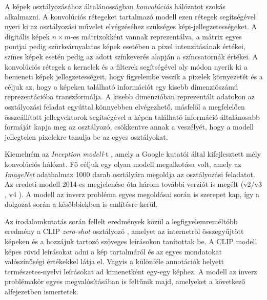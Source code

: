 A képek osztályozásához általánosságban \textit{konvolúciós} hálózatot szokás alkalmazni. A konvolúciós rétegeket tartalmazó modell ezen rétegek segítségével nyeri ki az osztályozási művelet elvégzéséhez szükséges képi-jellegzetességeket. A digitális képek $n \times m$-es mátrixokként vannak reprezentálva, a mátrix egyes pontjai pedig szürkeárnyalatos képek esetében a pixel intenzitásának értékei, színes képek esetén pedig az adott színkeverés alapján a színcsatornák értékei. A konvolúciós rétegek a kernelek és a filterek segítségével oly módon nyerik ki a bemeneti képek jellegzetességeit, hogy figyelembe veszik a pixelek környezetét és a céljuk az, hogy a képeken található információt egy kisebb dimenziószámú reprezentációba transzformálja. A kisebb dimenzióban reprezentált adatokon az osztályozási feladat egyúttal könnyebben elvégezhető, másfelől a megfelelően összeállított jellegvektorok segítségével a képen található információ általánosabb formáját kapja meg az osztályozó, csökkentve annak a veszélyét, hogy a modell jellegtelen pixelekre tanulja be az egyes osztályokat.

Kiemelném az \textit{Inception modell}-t \cite{szegedy2015going}, amely a Google kutatói által kifejlesztett mély konvolúciós hálózat. Fő céljuk egy olyan modell megalkotása volt, amely az \textit{ImageNet} adathalmaz \cite{deng2009imagenet} 1000 darab osztályára megoldja az osztályozási feladatot. Az eredeti modell 2014-es megjelenése óta három további verziót is megélt (v2/v3 \cite{szegedy2016rethinking}, v4 \cite{szegedy2017inception}). A modell az inverz probléma egyes megoldásai során is szerepet kap, így a dolgozat során a későbbiekben is említésre kerül.

Az irodalomkutatás során fellelt eredmények közül a legfigyelemreméltóbb eredmény a CLIP \textit{zero-shot} osztályozó \cite{radford2021learning}, amelyet az internetről összegyűjtött képeken és a hozzájuk tartozó szöveges leírásokon tanítottak be. A CLIP modell képes rövid leírásokat adni a kép tartalmáról és az egyes mondatokat valószínűségi értékekkel látja el. Vagyis a különféle annotációk helyett természetes-nyelvi leírásokat ad kimenetként egy-egy képhez. A modell az inverz problémakör egyes megvalósításában is feltűnik majd, amelyeket a következő alfejezetben ismertetek.



